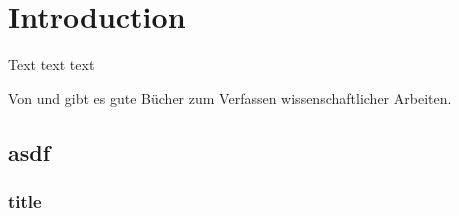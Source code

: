 
\chapter{Introduction}

Text text text 

Von \citet[deutsch]{Niederhauser2006} und
\citet[englisch]{Gustavii2003} gibt es gute Bücher zum Verfassen
wissenschaftlicher Arbeiten.

	\section{asdf}
		
		\subsection{title}